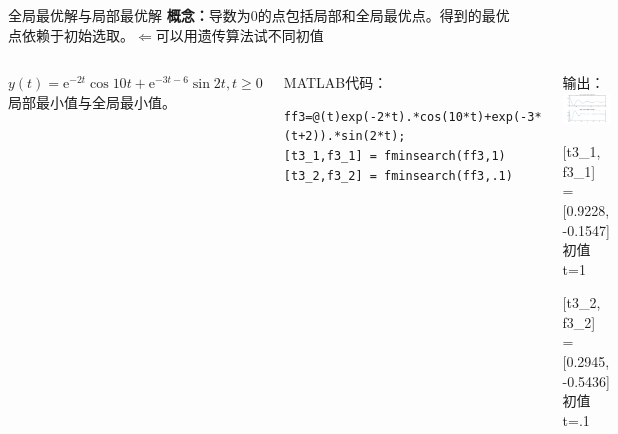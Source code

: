 \documentclass[10pt]{beamer}
\begin{document}
\begin{frame}[fragile]{全局最优解与局部最优解}
	\textbf{概念：}导数为0的点包括局部和全局最优点。得到的最优点依赖于初始选取。$\Leftarrow$可以用遗传算法试不同初值
	
	\begin{columns}[T]
		
	\begin{example}[6-13]
		$y(t)=\mathrm{e}^{-2 t} \cos 10 t+\mathrm{e}^{-3 t-6} \sin 2 t, t \geqslant 0$局部最小值与全局最小值。
	\end{example}
	
	\begin{block}{MATLAB代码：}
\begin{lstlisting}
ff3=@(t)exp(-2*t).*cos(10*t)+exp(-3*(t+2)).*sin(2*t);
[t3_1,f3_1] = fminsearch(ff3,1)
[t3_2,f3_2] = fminsearch(ff3,.1)
\end{lstlisting}
	\end{block}	
	
		
		\begin{block}{输出：}
	\centering
	\includegraphics[width=.8\textwidth]{23}
			
	[t3\_1, f3\_1] =[0.9228, -0.1547] 初值t=1
	
	[t3\_2, f3\_2] =[0.2945, -0.5436] 初值t=.1
		\end{block}
		
	\end{columns}
\end{frame}
\end{document}
